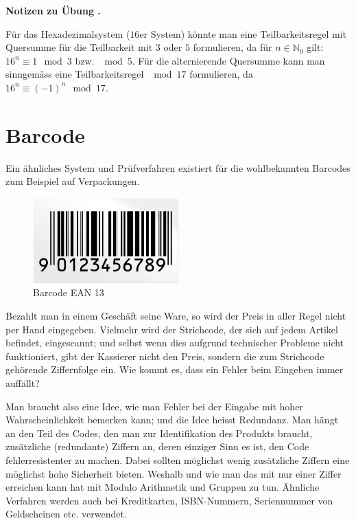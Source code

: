 \documentclass[%
11pt,%
twoside,%
titlepage,%
swissgerman,%
headsepline%
]{scrartcl}
\newcommand{\faReturnGray}{\textcolor{gray}{\faMailReply}} %
\theoremstyle{definition}
\theoremstyle{plain}
\newcommand{\concatueb}[1]{ueb:#1}%
\newcommand{\concatlsg}[1]{lsg:#1}%
\newcounter{uebcounter}[section]
\renewcommand{\theuebcounter}{\thesection.\arabic{uebcounter}}  %
\newenvironment{lsg}[1]{%
    \par\noindent\textbf{Notizen zu Übung \theuebcounter\label{\concatlsg{#1}}}
    \hfill\hyperref[\concatueb{#1}]{\faReturnGray}\par %
}{%
    \par%
}
\begin{document}
\begin{lsg}{hexateilbarkeit}
        Für das Hexadezimalsystem ($16$er System) könnte man eine Teilbarkeitsregel mit Quersumme für die Teilbarkeit mit $3$ oder $5$ formulieren, da für $n\in\mathbb{N}_0$ gilt: $16^n\equiv 1\mod3$ bzw. $\mod5$. Für die alternierende Quersumme kann man sinngemäss eine Teilbarkeitsregel $\mod17$ formulieren, da $16^n\equiv(-1)^n\mod17$.
\end{lsg}

\clearpage

\section{Barcode}
Ein ähnliches System und Prüfverfahren existiert für die wohlbekannten Barcodes zum Beispiel auf Verpackungen.

\begin{figure}
\begin{center}
\includegraphics[width=0.5\textwidth]{pictures/barcode}
\end{center}
\caption{Barcode EAN 13}
\end{figure}

Bezahlt man in einem Geschäft seine Ware, so wird der Preis in aller Regel nicht per Hand eingegeben. Vielmehr wird der Strichcode, der sich auf jedem Artikel befindet, eingescannt; und selbst wenn dies aufgrund technischer Probleme nicht funktioniert, gibt der Kassierer nicht den Preis, sondern die zum Strichcode gehörende Ziffernfolge ein. Wie kommt es, dass ein Fehler beim Eingeben immer auffällt?

Man braucht also eine Idee, wie man Fehler bei der Eingabe mit hoher Wahrscheinlichkeit bemerken kann; und die Idee heisst Redundanz. Man hängt an den Teil des Codes, den man zur Identifikation des Produkts braucht, zusätzliche (redundante) Ziffern an, deren einziger Sinn es ist, den Code fehlerresistenter zu machen. Dabei sollten möglichst wenig zusätzliche Ziffern eine möglichst hohe Sicherheit bieten. Weshalb und wie man das mit nur einer Ziffer erreichen kann hat mit Modulo Arithmetik und Gruppen zu tun. Ähnliche Verfahren werden auch bei Kreditkarten, ISBN-Nummern, Seriennummer von Geldscheinen etc. verwendet.
\end{document}
